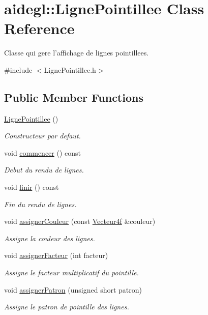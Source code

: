 \hypertarget{classaidegl_1_1_ligne_pointillee}{\section{aidegl\-:\-:Ligne\-Pointillee Class Reference}
\label{classaidegl_1_1_ligne_pointillee}
}


Classe qui gere l'affichage de lignes pointillees.  




{\ttfamily \#include $<$Ligne\-Pointillee.\-h$>$}

\subsection*{Public Member Functions}
\begin{DoxyCompactItemize}
\item 
\hyperlink{classaidegl_1_1_ligne_pointillee_a4fc590690c8bbc7368fb355a71d5eaf2}{Ligne\-Pointillee} ()
\begin{DoxyCompactList}\small\item\em Constructeur par defaut. \end{DoxyCompactList}\item 
void \hyperlink{classaidegl_1_1_ligne_pointillee_a455e3f5a717d72b04808c90c3d20f23f}{commencer} () const 
\begin{DoxyCompactList}\small\item\em Debut du rendu de lignes. \end{DoxyCompactList}\item 
void \hyperlink{classaidegl_1_1_ligne_pointillee_a5a1522b90f6970b3a33103935bed74da}{finir} () const 
\begin{DoxyCompactList}\small\item\em Fin du rendu de lignes. \end{DoxyCompactList}\item 
void \hyperlink{classaidegl_1_1_ligne_pointillee_af051ae200dfd9a5f5a26591a139e7939}{assigner\-Couleur} (const \hyperlink{group__utilitaire_ga6a8205c734fc1c9d1272ea424efb2606}{Vecteur4f} \&couleur)
\begin{DoxyCompactList}\small\item\em Assigne la couleur des lignes. \end{DoxyCompactList}\item 
void \hyperlink{classaidegl_1_1_ligne_pointillee_a0d9e3b0ca2604f1e9410b868a8917a78}{assigner\-Facteur} (int facteur)
\begin{DoxyCompactList}\small\item\em Assigne le facteur multiplicatif du pointille. \end{DoxyCompactList}\item 
void \hyperlink{classaidegl_1_1_ligne_pointillee_a2eb75fea1bec5566ca4feae3612d7b5e}{assigner\-Patron} (unsigned short patron)
\begin{DoxyCompactList}\small\item\em Assigne le patron de pointille des lignes. \end{DoxyCompactList}\end{DoxyCompactItemize}


